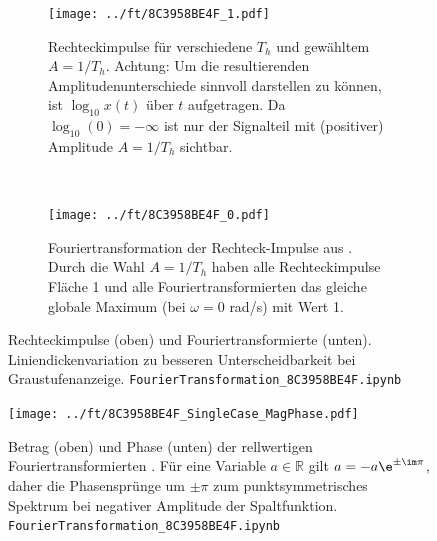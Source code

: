 \begin{figure}[h!]
\centering
\begin{subfigure}{1\textwidth}
\centering
\texttt{[image: ../ft/8C3958BE4F\_1.pdf]}
\caption{Rechteckimpulse für verschiedene $T_h$ und gewähltem $A=1/T_h$.
Achtung: Um die resultierenden Amplitudenunterschiede sinnvoll darstellen zu können,
ist $\log_{10}x(t)$ über $t$ aufgetragen. Da $\log_{10}(0)=-\infty$
ist nur der Signalteil mit (positiver) Amplitude $A=1/T_h$ sichtbar.}
\label{fig:8C3958BE4F_1}
\end{subfigure}
\\
\begin{subfigure}{1\textwidth}
\centering
\texttt{[image: ../ft/8C3958BE4F\_0.pdf]}
\caption{Fouriertransformation der Rechteck-Impulse aus
. Durch die Wahl $A=1/T_h$ haben alle Rechteckimpulse Fläche
1 und alle Fouriertransformierten
das gleiche globale Maximum (bei $\omega=0$ rad/s) mit Wert 1.}
\label{fig:8C3958BE4F_0}
\end{subfigure}
%
\caption{Rechteckimpulse (oben) und Fouriertransformierte (unten).
Liniendickenvariation zu besseren Unterscheidbarkeit bei Graustufenanzeige.
\texttt{FourierTransformation\_8C3958BE4F.ipynb}}
\label{fig:8C3958BE4F}
\end{figure}


\begin{figure}[h!]
\texttt{[image: ../ft/8C3958BE4F\_SingleCase\_MagPhase.pdf]}
  \caption{Betrag (oben) und Phase (unten) der rellwertigen
  Fouriertransformierten . Für eine Variable
  $a\in\mathbb{R}$ gilt $a = -a \e^{\pm\im\pi}$, daher
  die Phasensprünge um $\pm\pi$ zum punktsymmetrisches Spektrum
  bei negativer Amplitude der Spaltfunktion.
\texttt{FourierTransformation\_8C3958BE4F.ipynb}}
  \label{fig:8C3958BE4F_SingleCase_MagPhase}
\end{figure}




\clearpage
